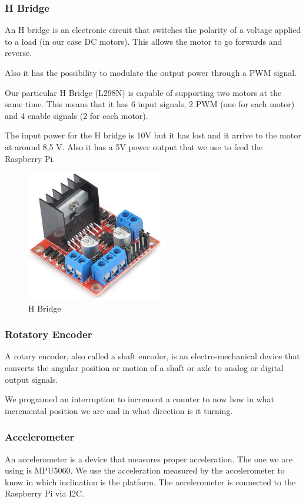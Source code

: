 \subsubsection{H Bridge}
An H bridge is an electronic circuit that switches the polarity of a
voltage applied to a load (in our case DC motors). This allows the motor to
go forwards and reverse.

Also it has the possibility to modulate the output power through a PWM signal.

Our particular H Bridge (L298N) is capable of supporting two motors at the same time.
This means that it has 6 input signals, 2 PWM (one for each motor) and 4 enable signals
(2 for each motor).

The input power for the H bridge is 10V but it has lost and it arrive to the motor
at around 8,5 V. Also it has a 5V power output that we use to feed the Raspberry
Pi.


\begin{figure}[H]
    \centering
    \includegraphics[width=6cm]{img/components/Hbridge.jpg}
    \caption{H Bridge}
    \label{fig: H Bridge}
\end{figure}


\subsubsection{Rotatory Encoder}
A rotary encoder, also called a shaft encoder, is an electro-mechanical device that converts the
angular position or motion of a shaft or axle to analog or digital output signals.

We programed an interruption to increment a counter to now how in what incremental position we are
and in what direction is it turning.
\subsubsection{Accelerometer}
An accelerometer is a device that measures proper acceleration. The one we are using is MPU5060.
We use the acceleration measured by the accelerometer to know in which inclination
is the platform. The accelerometer is connected to the Raspberry Pi via I2C.

